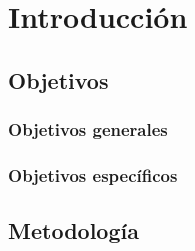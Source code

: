 \chapter*{Introducción}

\section{Objetivos}
\subsection{Objetivos generales}
\subsection{Objetivos específicos}

\section{Metodología}
